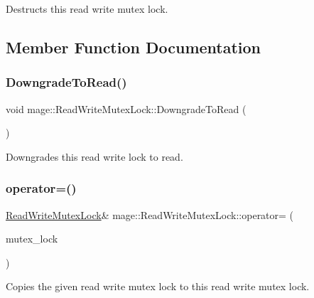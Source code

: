 Destructs this read write mutex lock. 

\subsection{Member Function Documentation}
\hypertarget{structmage_1_1_read_write_mutex_lock_a1300da588c4a0950cca5a3b6a65d5f29}{}\label{structmage_1_1_read_write_mutex_lock_a1300da588c4a0950cca5a3b6a65d5f29} 
\subsubsection{\texorpdfstring{Downgrade\+To\+Read()}{DowngradeToRead()}}
{\footnotesize\ttfamily void mage\+::\+Read\+Write\+Mutex\+Lock\+::\+Downgrade\+To\+Read (\begin{DoxyParamCaption}{ }\end{DoxyParamCaption})\hspace{0.3cm}{\ttfamily [noexcept]}}

Downgrades this read write lock to read. \hypertarget{structmage_1_1_read_write_mutex_lock_ade82a57f337e39a1515f67fbc1f6fc43}{}\label{structmage_1_1_read_write_mutex_lock_ade82a57f337e39a1515f67fbc1f6fc43} 
\subsubsection{\texorpdfstring{operator=()}{operator=()}\hspace{0.1cm}{\footnotesize\ttfamily [1/2]}}
{\footnotesize\ttfamily \hyperlink{structmage_1_1_read_write_mutex_lock}{Read\+Write\+Mutex\+Lock}\& mage\+::\+Read\+Write\+Mutex\+Lock\+::operator= (\begin{DoxyParamCaption}\item[{const \hyperlink{structmage_1_1_read_write_mutex_lock}{Read\+Write\+Mutex\+Lock} \&}]{mutex\+\_\+lock }\end{DoxyParamCaption})\hspace{0.3cm}{\ttfamily [delete]}}

Copies the given read write mutex lock to this read write mutex lock.


